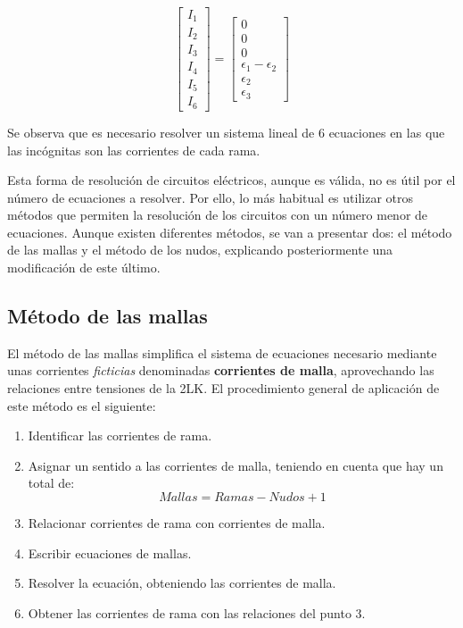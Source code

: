 \begin{example}
\begin{enumerate}
\begin{equation*}
				\begin{bmatrix}
					I_1\\
					I_2\\
					I_3\\
					I_4\\
					I_5\\
					I_6    
				\end{bmatrix} = %
				\begin{bmatrix}
					0\\
					0\\
					0\\
					\epsilon_1 - \epsilon_2\\
					\epsilon_2\\
					\epsilon_3
				\end{bmatrix}
			\end{equation*}
		\end{enumerate}
		Se observa que es necesario resolver un sistema lineal de 6 ecuaciones en las que las incógnitas son las corrientes de cada rama. 
	\end{example}
	
	Esta forma de resolución de circuitos eléctricos, aunque es válida, no es útil por el número de ecuaciones a resolver. Por ello, lo más habitual es utilizar otros métodos que permiten la resolución de los circuitos con un número menor de ecuaciones. Aunque existen diferentes métodos, se van a presentar dos: el método de las mallas y el método de los nudos, explicando posteriormente una modificación de este último.
	
	\subsection{Método de las mallas}
	El método de las mallas simplifica el sistema de ecuaciones necesario mediante unas corrientes \emph{ficticias} denominadas \textbf{corrientes de malla}, aprovechando las relaciones entre tensiones de la 2LK. El procedimiento general de aplicación de este método es el siguiente:
	\begin{enumerate}
		\item Identificar las corrientes de rama.
		\item Asignar un sentido a las corrientes de malla, teniendo en cuenta que hay un total de:
		\begin{equation*}
			{Mallas=Ramas-Nudos+1}
		\end{equation*}
		\item Relacionar corrientes de rama con corrientes de malla.
		\item Escribir ecuaciones de mallas.
		\item Resolver la ecuación, obteniendo las corrientes de malla.
		\item Obtener las corrientes de rama con las relaciones del punto 3.
	\end{enumerate}
	
